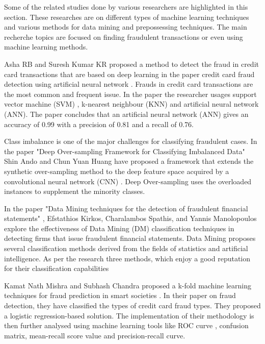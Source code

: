 
Some of the related studies done by various researchers are highlighted in this section. These researches are on different types of machine learning techniques and various methods for data mining and prepossessing techniques. The main recherche topics are focused on finding fraudulent transactions or even using machine learning methods. 


Asha RB and Suresh Kumar KR proposed a method to detect the fraud in credit card transactions that are based on deep learning \cite{GoodBengCour16} in the paper credit card fraud detection using artificial neural network \cite{RB2021}. Frauds in credit card transactions are the most common and frequent issue. In the paper the researcher usages support vector machine (SVM) \cite{Cristianini2008}, k-nearest neighbour (KNN) \cite{Mucherino2009} and artificial neural network (ANN). The paper concludes that an artificial neural network (ANN) gives an accuracy of 0.99 with a precision of 0.81 and a recall of 0.76.



Class imbalance is one of the major challenges for classifying fraudulent cases. In the paper "Deep Over-sampling Framework for Classifying Imbalanced Data" \cite{ando2017deep} Shin Ando and Chun Yuan Huang have proposed a framework that extends the synthetic over-sampling method to the deep feature space acquired by a convolutional neural network (CNN) \cite{Yamashita2018}. Deep Over-sampling uses the overloaded instances to supplement the minority classes.  


In the paper "Data Mining techniques for the detection of fraudulent financial statements" \cite{KIRKOS2007995}, Efstathios Kirkos, Charalambos Spathis, and Yannis Manolopoulos explore the effectiveness of Data Mining (DM) classification techniques in detecting firms that issue fraudulent financial statements. Data Mining proposes several classification methods derived from the fields of statistics and artificial intelligence. As per the research three methods, which enjoy a good reputation for their classification capabilities


Kamat Nath Mishra and Subhash Chandra proposed a k-fold machine learning techniques for fraud prediction in smart societies \cite{Mishra2021}. In their paper on fraud detection, they have classified the types of credit card fraud types. They proposed a logistic regression-based solution. The implementation of their methodology is then further analysed using machine learning tools like ROC curve \cite{FAWCETT2006861}, confusion matrix, mean-recall score value and precision-recall curve. 



